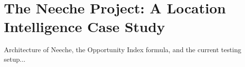 \chapter{The Neeche Project: A Location Intelligence Case Study}
\label{chap:neeche_app}

Architecture of Neeche, the Opportunity Index formula, and the current testing setup...
